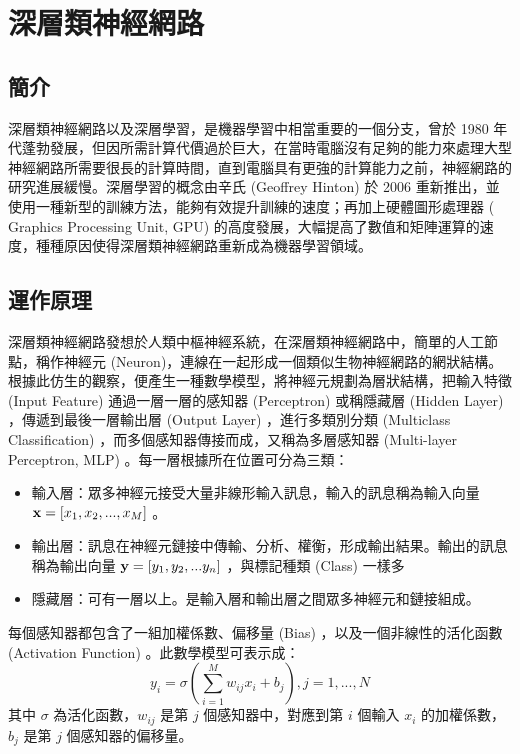 \section{深層類神經網路}

\subsection{簡介}
深層類神經網路以及深層學習，是機器學習中相當重要的一個分支，曾於 1980 年代蓬勃發展，但因所需計算代價過於巨大，在當時電腦沒有足夠的能力來處理大型神經網路所需要很長的計算時間，直到電腦具有更強的計算能力之前，神經網路的研究進展緩慢。深層學習的概念由辛氏 (Geoffrey Hinton) 於 2006 重新推出，並使用一種新型的訓練方法，能夠有效提升訓練的速度；再加上硬體圖形處理器 ( Graphics Processing Unit, GPU) 的高度發展，大幅提高了數值和矩陣運算的速度，種種原因使得深層類神經網路重新成為機器學習領域。

\subsection{運作原理}
深層類神經網路發想於人類中樞神經系統，在深層類神經網路中，簡單的人工節點，稱作神經元 (Neuron)，連線在一起形成一個類似生物神經網路的網狀結構。根據此仿生的觀察，便產生一種數學模型，將神經元規劃為層狀結構，把輸入特徵 (Input Feature) 通過一層一層的感知器 (Perceptron) 或稱隱藏層 (Hidden Layer) ，傳遞到最後一層輸出層 (Output Layer) ，進行多類別分類 (Multiclass Classification) ，而多個感知器傳接而成，又稱為多層感知器 (Multi-layer Perceptron, MLP) 。每一層根據所在位置可分為三類：
\begin{itemize}
    \item 輸入層：眾多神經元接受大量非線形輸入訊息，輸入的訊息稱為輸入向量 $\bold{x} = [x_1,x_2, ... , x_M]$ 。
    \item 輸出層：訊息在神經元鏈接中傳輸、分析、權衡，形成輸出結果。輸出的訊息稱為輸出向量 $\bold{y} = [y_1,y_2,...y_n]$ ，與標記種類 (Class) 一樣多
    \item 隱藏層：可有一層以上。是輸入層和輸出層之間眾多神經元和鏈接組成。
\end{itemize}
每個感知器都包含了一組加權係數、偏移量 (Bias) ，以及一個非線性的活化函數 (Activation Function) 。此數學模型可表示成：
\begin{equation}
    y_i = \sigma{(\sum_{i=1}^M w_{ij}x_i+b_j)} ,  j= 1,...,N
\end{equation}
其中 $\sigma$ 為活化函數，$w_{ij}$ 是第 $j$ 個感知器中，對應到第 $i$ 個輸入 $x_i$ 的加權係數，$b_j$ 是第 $j$ 個感知器的偏移量。

